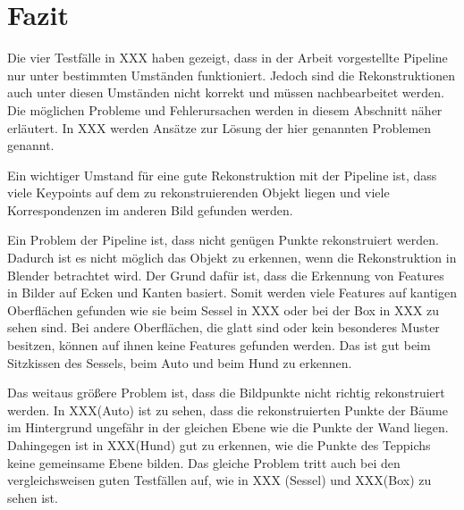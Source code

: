 \chapter{Fazit}
\label{sec:conclusion}

Die vier Testfälle in XXX haben gezeigt, dass in der Arbeit vorgestellte Pipeline nur unter bestimmten Umständen funktioniert.
Jedoch sind die Rekonstruktionen auch unter diesen Umständen nicht korrekt und müssen nachbearbeitet werden.
Die möglichen Probleme und Fehlerursachen werden in diesem Abschnitt näher erläutert.
In XXX werden Ansätze zur Lösung der hier genannten Problemen genannt.

Ein wichtiger Umstand für eine gute Rekonstruktion mit der Pipeline ist, dass viele Keypoints auf dem zu rekonstruierenden Objekt liegen und viele Korrespondenzen im anderen Bild gefunden werden.

Ein Problem der Pipeline ist, dass nicht genügen Punkte rekonstruiert werden.
Dadurch ist es nicht möglich das Objekt zu erkennen, wenn die Rekonstruktion in Blender betrachtet wird.
Der Grund dafür ist, dass die Erkennung von Features in Bilder auf Ecken und Kanten basiert.
Somit werden viele Features auf kantigen Oberflächen gefunden wie sie beim Sessel in XXX oder bei der Box in XXX zu sehen sind.
Bei andere Oberflächen, die glatt sind oder kein besonderes Muster besitzen, können auf ihnen keine Features gefunden werden.
Das ist gut beim Sitzkissen des Sessels, beim Auto und beim Hund zu erkennen. 

Das weitaus größere Problem ist, dass die Bildpunkte nicht richtig rekonstruiert werden.
In XXX(Auto) ist zu sehen, dass die rekonstruierten Punkte der Bäume im Hintergrund ungefähr in der gleichen Ebene wie die Punkte der Wand liegen.  
Dahingegen ist in XXX(Hund) gut zu erkennen, wie die Punkte des Teppichs keine gemeinsame Ebene bilden.
Das gleiche Problem tritt auch bei den vergleichsweisen guten Testfällen auf, wie in XXX (Sessel) und XXX(Box) zu sehen ist.

